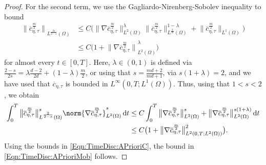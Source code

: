 \documentclass[a4paper,12pt]{article}
\newcommand{\dt}{\mathrm{\,d}t}
\newcommand{\cbar}{\overline{c}}
\theoremstyle{plain}
\theoremstyle{definition}
\numberwithin{equation}{section}
\begin{document}
\begin{proof}
For the second term, we use the Gagliardo-Nirenberg-Sobolev inequality to bound
\begin{align*}
\big\|{\cbar^{\frac{m}{2}}_{\eta,\tau}\big\|}_{L^\frac{2s}{2-s}(\Omega)} 
&\leq C\big(\big\|{\nabla \cbar_{\eta,\tau}^{\frac{m}{2}}}\big\|^\lambda_{L^2(\Omega)}\big\|{\cbar_{\eta,\tau}^\frac{m}{2}}\big\|^{1-\lambda}_{L^\frac{2}{m}(\Omega)} + \big\|{ \cbar_{\eta,\tau}^{\frac{m}{2}}}\big\|_{L^1(\Omega)}\big)\\
&\leq C\big(1+\big\|{\nabla \cbar_{\eta,\tau}^{\frac{m}{2}}\big\|}^\lambda_{L^2(\Omega)}\big)
\end{align*}
for almost every $t\in [0,T]$. Here, $\lambda\in(0,1)$ is defined via $\frac{2-s}{2s} = \lambda\frac{d-2}{2d} + (1{-}\lambda)\frac{m}{2}$, or using that $s=\frac{md+2}{md+1}$, via $s(1+\lambda)=2$, and we have used that $\cbar_{\eta,\tau}$ is bounded in $L^\infty(0,T;L^1(\Omega))$. 
Thus, using that $1<s<2$, we obtain
\begin{align*}
    \int_0^T \big\|{\cbar^{\frac{m}{2}}_{\eta,\tau}}\big\|^s_{L^\frac{2}{2-s}(\Omega)}\norm{\nabla \cbar_{\eta,\tau}^{\frac{m}{2}}}^s_{L^2(\Omega)}\dt 
    &\leq C\int_0^T \big\|{\nabla \cbar_{\eta,\tau}^{\frac{m}{2}}}\big\|^s_{L^2(\Omega)} +  \big\|{\nabla \cbar_{\eta,\tau}^\frac{m}{2}}\big\|^{s(1+\lambda)}_{L^2(\Omega)} \dt\\
    &\leq C\big(1+\big\|{\nabla \cbar_{\eta,\tau}^\frac{m}{2}}\big\|^{2}_{L^2(0,T;L^2(\Omega))}\big).
\end{align*}
Using the bounds in \eqref{Eqn:TimeDisc:APrioriC}, the bound in \eqref{Eqn:TimeDisc:APrioriMob} follows.

 


\end{proof}
\end{document}
